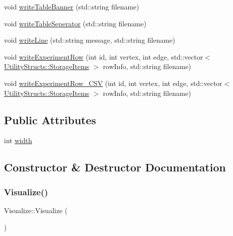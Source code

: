 \begin{DoxyCompactItemize}
void \hyperlink{class_visualize_a14c9e9721eeaca0afde25da0138b43b8_a14c9e9721eeaca0afde25da0138b43b8}{write\+Table\+Banner} (std\+::string filename)
\item 
void \hyperlink{class_visualize_ac5530b8e917c748163e621cf5677eeb5_ac5530b8e917c748163e621cf5677eeb5}{write\+Table\+Seperator} (std\+::string filename)
\item 
void \hyperlink{class_visualize_a9ccde29aab876a829335775898373e96_a9ccde29aab876a829335775898373e96}{write\+Line} (std\+::string message, std\+::string filename)
\item 
void \hyperlink{class_visualize_a8aefacec622221533485db6701d1119e_a8aefacec622221533485db6701d1119e}{write\+Experiment\+Row} (int id, int vertex, int edge, std\+::vector$<$ \hyperlink{struct_utility_structs_1_1_storage_items}{Utility\+Structs\+::\+Storage\+Items} $>$ row\+Info, std\+::string filename)
\item 
void \hyperlink{class_visualize_a8677a063c82af1b37b94c7d3a3ca3746_a8677a063c82af1b37b94c7d3a3ca3746}{write\+Experiment\+Row\+\_\+\+C\+SV} (int id, int vertex, int edge, std\+::vector$<$ \hyperlink{struct_utility_structs_1_1_storage_items}{Utility\+Structs\+::\+Storage\+Items} $>$ row\+Info, std\+::string filename)
\end{DoxyCompactItemize}
\subsection*{Public Attributes}
\begin{DoxyCompactItemize}
\item 
int \hyperlink{class_visualize_af5ac723ad5f8fe8c4a8378bf1299cda7_af5ac723ad5f8fe8c4a8378bf1299cda7}{width}
\end{DoxyCompactItemize}


\subsection{Constructor \& Destructor Documentation}
\mbox{\label{class_visualize_a8d4163ad53518ec0c8a3eaec2bf2fe7b_a8d4163ad53518ec0c8a3eaec2bf2fe7b}} 
\subsubsection{\texorpdfstring{Visualize()}{Visualize()}}
{\footnotesize\ttfamily Visualize\+::\+Visualize (\begin{DoxyParamCaption}{ }\end{DoxyParamCaption})\hspace{0.3cm}{\ttfamily [inline]}}



